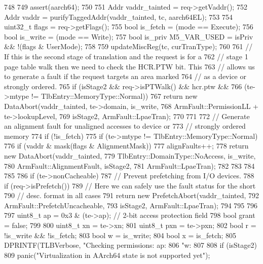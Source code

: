 \begin{DoxyCode}
748 {
749     assert(aarch64);
750 
751     Addr vaddr_tainted = req->getVaddr();
752     Addr vaddr = purifyTaggedAddr(vaddr_tainted, tc, aarch64EL);
753 
754     uint32_t flags = req->getFlags();
755     bool is_fetch  = (mode == Execute);
756     bool is_write  = (mode == Write);
757     bool is_priv M5_VAR_USED  = isPriv && !(flags & UserMode);
758 
759     updateMiscReg(tc, curTranType);
760 
761     // If this is the second stage of translation and the request is for a
762     // stage 1 page table walk then we need to check the HCR.PTW bit. This
763     // allows us to generate a fault if the request targets an area marked
764     // as a device or strongly ordered.
765     if (isStage2 && req->isPTWalk() && hcr.ptw &&
766         (te->mtype != TlbEntry::MemoryType::Normal)) {
767         return new DataAbort(vaddr_tainted, te->domain, is_write,
768                              ArmFault::PermissionLL + te->lookupLevel,
769                              isStage2, ArmFault::LpaeTran);
770     }
771 
772     // Generate an alignment fault for unaligned accesses to device or
773     // strongly ordered memory
774     if (!is_fetch) {
775         if (te->mtype != TlbEntry::MemoryType::Normal) {
776             if (vaddr & mask(flags & AlignmentMask)) {
777                 alignFaults++;
778                 return new DataAbort(vaddr_tainted,
779                                      TlbEntry::DomainType::NoAccess, is_write,
780                                      ArmFault::AlignmentFault, isStage2,
781                                      ArmFault::LpaeTran);
782             }
783         }
784     }
785 
786     if (te->nonCacheable) {
787         // Prevent prefetching from I/O devices.
788         if (req->isPrefetch()) {
789             // Here we can safely use the fault status for the short
790             // desc. format in all cases
791             return new PrefetchAbort(vaddr_tainted,
792                                      ArmFault::PrefetchUncacheable,
793                                      isStage2, ArmFault::LpaeTran);
794         }
795     }
796 
797     uint8_t ap  = 0x3 & (te->ap);  // 2-bit access protection field
798     bool grant = false;
799 
800     uint8_t xn =  te->xn;
801     uint8_t pxn = te->pxn;
802     bool r = !is_write && !is_fetch;
803     bool w = is_write;
804     bool x = is_fetch;
805     DPRINTF(TLBVerbose, "Checking permissions: ap:%
806                         "w:%
807 
808     if (isStage2) {
809         panic("Virtualization in AArch64 state is not supported yet");
}}
\end{DoxyCode}
